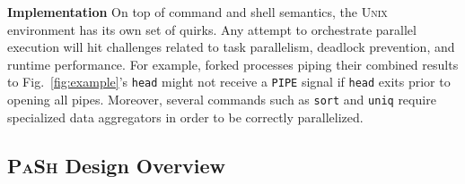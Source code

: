 \documentclass[sigplan, review, screen, anonymous]{acmart}
\newcommand{\heading}[1]{\vspace{4pt}\noindent\textbf{#1}\enspace}
\newcommand{\ttt}[1]{\texttt{#1}}
\newcommand{\sys}{{\scshape PaSh}\xspace}
\newcommand{\unix}{{\scshape Unix}\xspace}
\begin{document}
\heading{Implementation} %
On top of command and shell semantics, the \unix environment has its own set of quirks.
Any attempt to orchestrate parallel execution will hit challenges related to task parallelism, deadlock prevention, and runtime performance.
For example, forked processes piping their combined results to Fig.~\ref{fig:example}'s \ttt{head} might not receive a \ttt{PIPE} signal if \ttt{head} exits prior to opening all pipes.
Moreover, several commands such as \ttt{sort} and \ttt{uniq} require specialized data aggregators in order to be correctly parallelized.


\subsection{\sys Design Overview}
\label{bg:overview}
\end{document}
